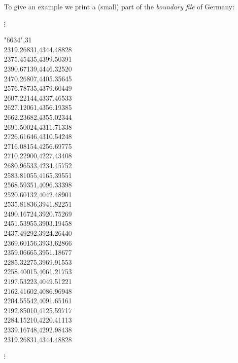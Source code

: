 To give an example we print a (small) part of the {\em boundary file} of Germany:

\begin{multicols}{3}
\footnotesize

\hspace{1cm}  $\vdots$

"6634",31 \\
2319.26831,4344.48828 \\
2375.45435,4399.50391 \\
2390.67139,4446.32520 \\
2470.26807,4405.35645 \\
2576.78735,4379.60449 \\
2607.22144,4337.46533 \\
2627.12061,4356.19385 \\
2662.23682,4355.02344 \\
2691.50024,4311.71338 \\
2726.61646,4310.54248 \\
2716.08154,4256.69775 \\
2710.22900,4227.43408 \\
2680.96533,4234.45752 \\
2583.81055,4165.39551 \\
2568.59351,4096.33398 \\
2520.60132,4042.48901 \\
2535.81836,3941.82251 \\
2490.16724,3920.75269 \\
2451.53955,3903.19458 \\
2437.49292,3924.26440 \\
2369.60156,3933.62866 \\
2359.06665,3951.18677 \\
2285.32275,3969.91553 \\
2258.40015,4061.21753 \\
2197.53223,4049.51221 \\
2162.41602,4086.96948 \\
2204.55542,4091.65161 \\
2192.85010,4125.59717 \\
2284.15210,4220.41113 \\
2339.16748,4292.98438 \\
2319.26831,4344.48828

\hspace{1cm} $\vdots$

\end{multicols}
\normalsize

